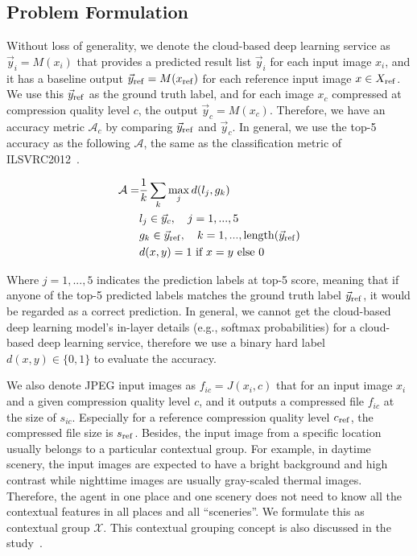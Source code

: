 \subsection{Problem Formulation}
\label{subsec: formulation}

Without loss of generality, we denote the cloud-based deep learning service as $ \vec{y}_i = M(x_i) $ that provides a predicted result list $ \vec{y}_i $ for each input image $ x_i $, and it has a baseline output $ \vec{y}_{\rm ref} = M(x_{\rm ref}) $ for each reference input image $ x \in X_{\rm ref} $. We use this $ \vec{y}_{\rm ref} $ as the ground truth label, and for each image $ x_c $ compressed at compression quality level $ c $, the output $ \vec{y}_c = M(x_c) $. Therefore, we have an accuracy metric $ \mathcal{A}_c $ by comparing $ \vec{y}_{\rm ref} $ and $ \vec{y}_c $. In general, we use the top-5 accuracy as the following $ \mathcal{A} $, the same as the classification metric of ILSVRC2012~\cite{ILSVRC12}.

\begin{align}
\mathcal{A} =& \frac{1}{k} \sum_{k}\max_jd(l_j, g_k) \\
& l_j \in \vec{y}_c, \quad j=1,...,5 \\
& g_k \in \vec{y}_{\rm ref}, \quad k=1, ..., {\rm length}(\vec{y}_{\rm ref}) \\
& d(x, y) = 1 \ \text{if} \ x=y  \ \text{else} \ 0 
\end{align}

Where $ j = 1,...,5 $ indicates the prediction labels at top-5 score, meaning that if anyone of the top-5 predicted labels matches the ground truth label $ \vec{y}_{\rm ref} $, it would be regarded as a correct prediction. In general, we cannot get the cloud-based deep learning model's in-layer details (e.g., softmax probabilities) for a cloud-based deep learning service, therefore we use a binary hard label $ d(x, y) \in \{0, 1\} $ to evaluate the accuracy. %

We also denote JPEG input images as $ f_{ic} = J(x_i, c) $ that for an input image $ x_i $ and a given compression quality level $ c $, and it outputs a compressed file $ f_{ic} $ at the size of $ s_{ic} $. Especially for a reference compression quality level $ c_{\rm ref} $, the compressed file size is $ s_{\rm ref} $. Besides, the input image from a specific location usually belongs to a particular contextual group. For example, in daytime scenery, the input images are expected to have a bright background and high contrast while nighttime images are usually gray-scaled thermal images. Therefore, the agent in one place and one scenery does not need to know all the contextual features in all places and all ``sceneries''. We formulate this as contextual group $ \mathcal{X} $. This contextual grouping concept is also discussed in the study~\cite{mcdnn}.

